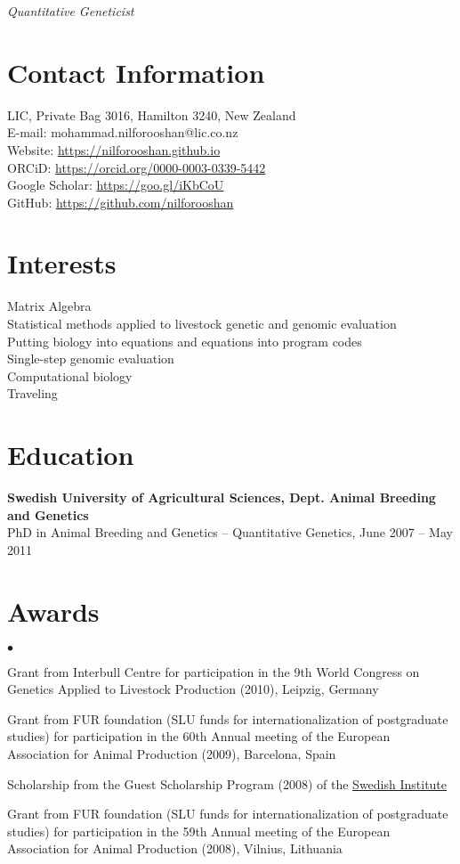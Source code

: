\documentclass[margin,line]{res}
\newenvironment{list2}{
  \begin{list}{$\bullet$}{%
      \setlength{\itemsep}{0in}
      \setlength{\parsep}{0in} \setlength{\parskip}{0in}
      \setlength{\topsep}{0in} \setlength{\partopsep}{0in}
      \setlength{\leftmargin}{0.2in}}}{\end{list}}
\begin{document}
 \hfill {\em Quantitative Geneticist}

\begin{resume}
\section{\sc Contact Information}

LIC, Private Bag 3016, Hamilton 3240, New Zealand \\
{E-mail:}  mohammad.nilforooshan@lic.co.nz \\
{Website:} \url{https://nilforooshan.github.io} \\
{ORCiD:} \url{https://orcid.org/0000-0003-0339-5442} \\
{Google Scholar:} \url{https://goo.gl/iKbCoU} \\
{GitHub:}  \url{https://github.com/nilforooshan}
\section{\sc Interests}

Matrix Algebra \\
Statistical methods applied to livestock genetic and genomic evaluation \\
Putting biology into equations and equations into program codes \\
Single-step genomic evaluation \\
Computational biology \\
Traveling
\section{\sc Education}

{\bf Swedish University of Agricultural Sciences, Dept. Animal Breeding and Genetics} \\
PhD in Animal Breeding and Genetics -- Quantitative Genetics, June 2007 -- May 2011
\section{\sc Awards}

\begin{list2}
\item Grant from Interbull Centre for participation in the 9th World Congress on Genetics Applied to Livestock Production (2010), Leipzig, Germany
\item Grant from FUR foundation (SLU funds for internationalization of postgraduate studies) for participation in the 60th Annual meeting of the European Association for Animal Production (2009), Barcelona, Spain
\item Scholarship from the Guest Scholarship Program (2008) of the \href{https://si.se/en}{Swedish Institute}
\item Grant from FUR foundation (SLU funds for internationalization of postgraduate studies) for participation in the 59th Annual meeting of the European Association for Animal Production (2008), Vilnius, Lithuania
\end{list2}

\end{resume}
\end{document}
